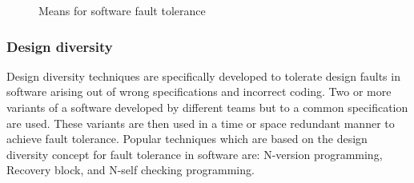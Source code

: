 \documentclass[a4paper, 11pt]{article}
\begin{document}
\begin{figure}[htbp]
\hspace*{2cm}
\caption{Means for software fault tolerance}
\label{fig:faulttoltree}
\end{figure}

\subsubsection{Design diversity}
Design diversity techniques are specifically developed to tolerate design faults in software arising out of wrong specifications and incorrect coding. Two or more variants of a software developed by different teams but to a common specification are used. These variants are then used in a time or space redundant manner to achieve fault tolerance. Popular techniques which are based on the design diversity concept for fault tolerance in software are: N-version programming, Recovery block, and N-self checking programming.
\end{document}
